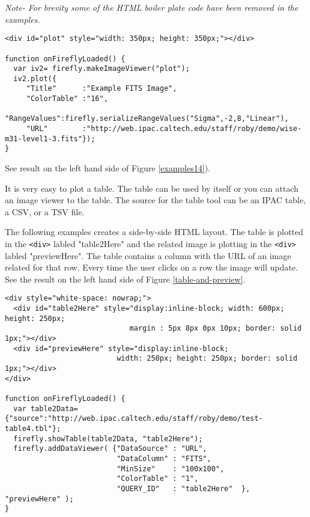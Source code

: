 \textit{Note- For brevity some of the HTML boiler plate code have been removed in the examples.}



\scriptsize
\begin{verbatim}
<div id="plot" style="width: 350px; height: 350px;"></div>

function onFireflyLoaded() {
  var iv2= firefly.makeImageViewer("plot");
  iv2.plot({   
     "Title"      :"Example FITS Image",
     "ColorTable" :"16",
     "RangeValues":firefly.serializeRangeValues("Sigma",-2,8,"Linear"),
     "URL"        :"http://web.ipac.caltech.edu/staff/roby/demo/wise-m31-level1-3.fits"});
}
\end{verbatim}
See result on the left hand side of Figure \ref{examples14}).
        
It is very easy to plot a table. The table can be used by itself or you can attach an image viewer to the table. The source for the table tool can be an IPAC table, a CSV, or a TSV file. 

The following examples creates a side-by-side HTML layout.  The table is plotted in the \scriptsize\texttt{<div>} \normalsize labled "table2Here" and the related image is plotting in the \scriptsize\texttt{<div>} \normalsize labled "previewHere". The table contains a column with the URL of an image related for that row. Every time the user clicks on a row the image will update. See the result on the left hand side of Figure \ref{table-and-preview}.

\scriptsize
\begin{verbatim}
<div style="white-space: nowrap;">
  <div id="table2Here" style="display:inline-block; width: 600px; height: 250px; 
                             margin : 5px 8px 0px 10px; border: solid 1px;"></div>
  <div id="previewHere" style="display:inline-block;
                          width: 250px; height: 250px; border: solid 1px;"></div>
</div>

function onFireflyLoaded() {
  var table2Data={"source":"http://web.ipac.caltech.edu/staff/roby/demo/test-table4.tbl"};
  firefly.showTable(table2Data, "table2Here");
  firefly.addDataViewer( {"DataSource" : "URL",
                          "DataColumn" : "FITS",
                          "MinSize"    : "100x100",
                          "ColorTable" : "1",
                          "QUERY_ID"   : "table2Here"  }, "previewHere" );
}
\end{verbatim}
\normalsize


